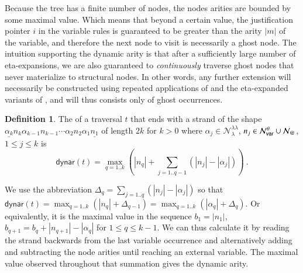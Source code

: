 \documentclass{elsarticle}
\makeatletter
\theoremstyle{plain}
\theoremstyle{definition}
\newtheorem{definition}{Definition}[section]
\newcommand\Nodes{\mathcal{N}}%
\newcommand\NodesVar{\Nodes_{\sf var}}%
\newcommand\NodesLmd{\Nodes_\lambda}%
\newcommand\NodesApp{\Nodes_@}%
\newcommand{\ghostlmd}{{\lambda\!\!\lambda}}
\newcommand{\ghostvar}{\theta}
\newcommand\ExtendedNodesVar{\NodesVar^\ghostvar}
\newcommand\ExtendedNodesLmd{\NodesLmd^\ghostlmd}
\newcommand\dynar{\textsf{dynar}} %
\makeatother
\begin{document}
Because the tree has a finite number of nodes, the nodes arities are bounded by some maximal value. Which means that beyond a certain value, the
justification pointer $i$ in the variable rules  is guaranteed to be greater than the arity $|m|$ of the variable, and therefore the next node to visit is necessarily a ghost node. The intuition supporting the dynamic arity is that after a sufficiently large number of eta-expansions, we are also guaranteed to \emph{continuously} traverse ghost nodes that never materialize to structural nodes. In other words, any further extension will necessarily be constructed using repeated applications of \rulenamet{Lam^\ghostvar} and the eta-expanded variants of , and will thus consists only of ghost occurrences.

\begin{definition} %
\label{dfn:dynamic-arity}
The  of a traversal $t$ that ends with a strand
 of the shape $\underline{\alpha_k} n_k \alpha_{k-1} n_{k-1}\cdots \alpha_2 n_2 \alpha_1 \underline{n_1}$ of length $2k$ for $k>0$ where $\alpha_j \in \ExtendedNodesLmd$, $n_j \in \ExtendedNodesVar\union\NodesApp$, $1\leq j\leq k$ is
$$
\dynar(t)
  = \max_{q=1..k} \left( |n_q| + \sum_{j=1..q-1} (|n_j|-|\alpha_j|) \right) \ .
$$
\end{definition}

We use the abbreviation $\Delta_q = \sum_{j=1..q} (|n_j|-|\alpha_j|)$ so that
$\dynar(t)
   = \max_{q=1..k} \left( |n_q| + \Delta_{q-1} \right)
   = \max_{q=1..k} \left( |\alpha_q| + \Delta_{q} \right)
$.
Or equivalently, it is the maximal value in the sequence $b_1 = |n_1|$, $b_{q+1} = b_q + |n_{q+1}|-|\alpha_q|$ for $1 \leq q \leq k-1$.
We can thus calculate it by reading the strand backwards from the last variable occurrence and alternatively adding and subtracting the node arities until reaching an external variable. The maximal value observed throughout that summation gives the dynamic arity.
\end{document}
